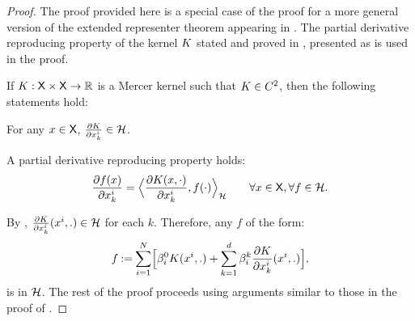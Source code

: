 \begin{proof}
 The proof provided here is a special case of the proof for a more general version of the extended representer theorem appearing in \cite{zho08}. The partial derivative reproducing property of the kernel $K$ stated and proved in \cite[Theorem 1]{zho08}, presented as  is used in the proof.  
 \begin{lemma}
 If $K :{\sf X} \times {\sf X} \to \mathbb{R}$ is a Mercer kernel such that $K \in C^2$, then the following statements hold:
 \begin{romannum}
 \item For any $x \in {\sf X}$, $\frac{\partial K}{\partial x^i_k} \in {\cal H}$. 
 \item A partial derivative reproducing property holds:
 \begin{equation}
 \frac{\partial f(x)}{\partial x^i_k} = \Bigl \langle \frac{\partial K(x, \cdot)}{\partial x^i_k} , f(\cdot) \Bigr \rangle_{\cal H} \qquad \forall x \in {\sf X}, \forall f \in {\cal H}.
 \end{equation}
 \end{romannum}
 \label{lemma:der_rep_property}
 \end{lemma}
 By , $\frac{\partial K}{\partial x^i_k}(x^i,.) \in {\cal H}$ for each $k$.
Therefore, any $f$ of the form:
	\[
	f \mathbin{:=}  \sum_{i=1}^N  \Bigl[
	\beta_i^{0}  K(x^i, .)   +  \sum_{k =1}^d  \beta_i^{k} \frac{\partial K}{\partial x^i_k}  (x^i, .) \Bigr],
	\]
	is in ${\cal H}$. The rest of the proof proceeds using arguments similar to those in the proof of . 


\end{proof}
